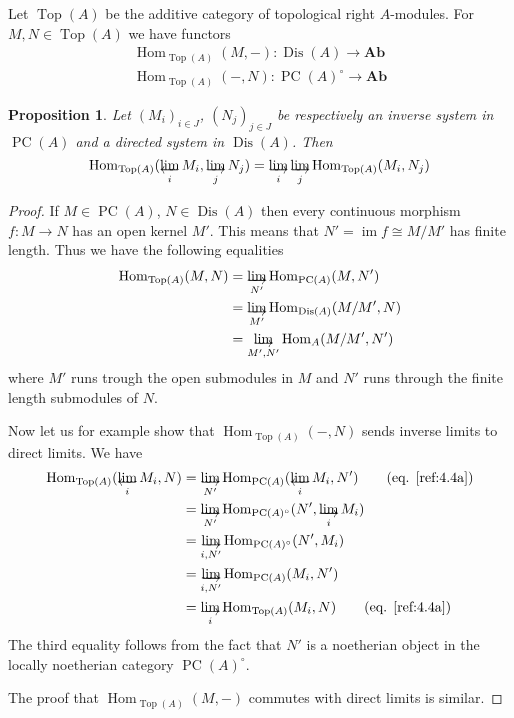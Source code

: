 \documentclass{amsproc}
\DeclareMathOperator{\Dis}{Dis}
\def\Ab{\mathbf{Ab}}
\def\Hom{\operatorname {Hom}}
\def\im{\operatorname {im}}
\def\r{\rightarrow}
\let\oldtext\text
\def\text#1{\oldtext{\upshape #1}}
\let\invlim\projlim
\DeclareMathOperator{\PC}{PC}
\DeclareMathOperator{\Top}{Top}
\newtheorem{proposition}[lemma]{Proposition}
\theoremstyle{definition}
\theoremstyle{remark}
\def\dirlim{\mathop{\vtop{\baselineskip -100pt\lineskip -1pt\lineskiplimit 0pt
\setbox0\hbox{\upshape lim}\copy0\hbox to \wd0{\rightarrowfill}}}\limits}
\def\invlim{\mathop{\vtop{\baselineskip -100pt\lineskip -1pt\lineskiplimit 0pt
\setbox0\hbox{\upshape lim}\copy0\hbox to \wd0{\leftarrowfill}}}\limits}
\numberwithin{equation}{section}
\numberwithin{table}{section}
\numberwithin{figure}{section}
\begin{document}
Let $\Top(A)$ be the additive category of topological right $A$-modules.
For $M,N\in \Top(A)$ we  have functors
\begin{gather}
\label{ref:4.1b}
\Hom_{\Top(A)}(M,-): \Dis(A)\r \Ab\\
\Hom_{\Top(A)}(-,N):\PC(A)^\circ\r \Ab
\label{ref:4.2b}
\end{gather}
\begin{proposition}
\label{ref:4.3a}
Let $(M_i)_{i\in J}$, $(N_j)_{j\in J}$ be respectively an inverse
system in $\PC(A)$ and a directed system in $\Dis(A)$. Then
\begin{equation}
\label{ref:4.3b}
\Hom_{\Top(A)}(\invlim_i M_i,\dirlim_j
N_j)=\dirlim_i\dirlim_j\Hom_{\Top(A)}(M_i,N_j)
\end{equation}
\end{proposition}
\begin{proof}
  If $M\in\PC(A)$, $N\in\Dis(A)$ then every continuous morphism $f:M\r
  N$ has an open kernel $M'$. This means that $N'=\im f\cong M/M'$ has
  finite length.  Thus we have the following equalities
\begin{align}
\label{ref:4.4a}
\Hom_{\Top(A)}(M,N)&=\dirlim_{N'}\Hom_{\PC(A)}(M,N')\\
\label{ref:4.5a}
&=\dirlim_{M'}\Hom_{\Dis(A)}(M/M',N)\\
\label{ref:4.6a}
&=\dirlim_{M',N'}\Hom_A(M/M',N')
\end{align}
where $M'$ runs trough the open submodules in $M$ and $N'$ runs through
the finite length submodules of $N$. 

Now let us for example show that $\Hom_{\Top(A)}(-,N)$ sends inverse
limits  to direct limits. We have
\begin{align*}
\Hom_{\Top(A)}(\invlim_i M_i,N)&=
\dirlim_{N'} \Hom_{\PC(A)}(\invlim_i M_i,N')\qquad\text{(eq.
\eqref{ref:4.4a})}\\
&=\dirlim_{N'} \Hom_{\PC(A)^\circ}(N',\dirlim_i M_i)
\\ &=\dirlim_{i,N'} \Hom_{\PC(A)^\circ}(N',M_i)\\
&=\dirlim_{i,N'}\Hom_{\PC(A)}(M_i,N')\\
&=\dirlim_i \Hom_{\Top(A)} (M_i,N)\qquad\text{(eq.
\eqref{ref:4.4a})}
\end{align*}
The third equality follows from the fact that $N'$ is a noetherian object
in the locally noetherian category $\PC(A)^\circ$.

The proof that $\Hom_{\Top(A)}(M,-)$ commutes with direct limits is similar.
\end{proof}
\end{document}
